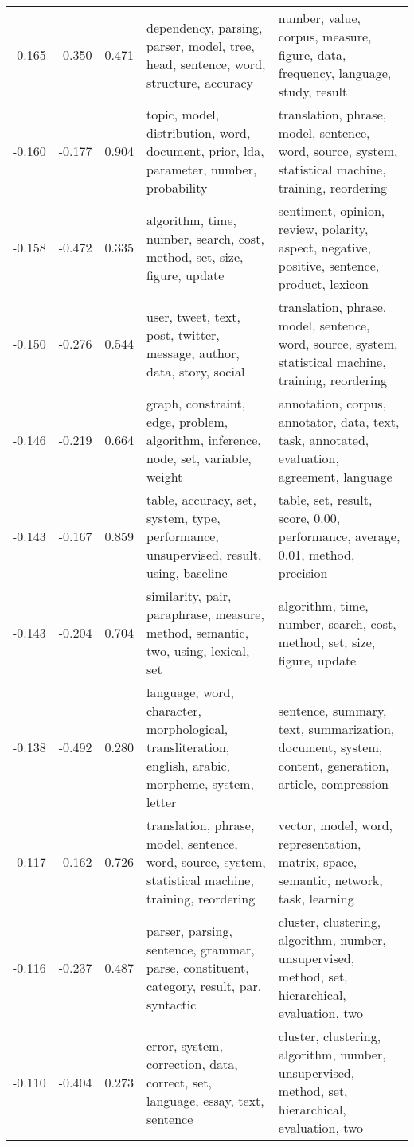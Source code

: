 \begin{tabular}{cccp{5cm}p{5cm}}
-0.165 & -0.350 & 0.471 & dependency, parsing, parser, model, tree, head, sentence, word, structure, accuracy & number, value, corpus, measure, figure, data, frequency, language, study, result \\
-0.160 & -0.177 & 0.904 & topic, model, distribution, word, document, prior, lda, parameter, number, probability & translation, phrase, model, sentence, word, source, system, statistical machine, training, reordering \\
-0.158 & -0.472 & 0.335 & algorithm, time, number, search, cost, method, set, size, figure, update & sentiment, opinion, review, polarity, aspect, negative, positive, sentence, product, lexicon \\
-0.150 & -0.276 & 0.544 & user, tweet, text, post, twitter, message, author, data, story, social & translation, phrase, model, sentence, word, source, system, statistical machine, training, reordering \\
-0.146 & -0.219 & 0.664 & graph, constraint, edge, problem, algorithm, inference, node, set, variable, weight & annotation, corpus, annotator, data, text, task, annotated, evaluation, agreement, language \\
-0.143 & -0.167 & 0.859 & table, accuracy, set, system, type, performance, unsupervised, result, using, baseline & table, set, result, score, 0.00, performance, average, 0.01, method, precision \\
-0.143 & -0.204 & 0.704 & similarity, pair, paraphrase, measure, method, semantic, two, using, lexical, set & algorithm, time, number, search, cost, method, set, size, figure, update \\
-0.138 & -0.492 & 0.280 & language, word, character, morphological, transliteration, english, arabic, morpheme, system, letter & sentence, summary, text, summarization, document, system, content, generation, article, compression \\
-0.117 & -0.162 & 0.726 & translation, phrase, model, sentence, word, source, system, statistical machine, training, reordering & vector, model, word, representation, matrix, space, semantic, network, task, learning \\
-0.116 & -0.237 & 0.487 & parser, parsing, sentence, grammar, parse, constituent, category, result, par, syntactic & cluster, clustering, algorithm, number, unsupervised, method, set, hierarchical, evaluation, two \\
-0.110 & -0.404 & 0.273 & error, system, correction, data, correct, set, language, essay, text, sentence & cluster, clustering, algorithm, number, unsupervised, method, set, hierarchical, evaluation, two \\

\end{tabular}
